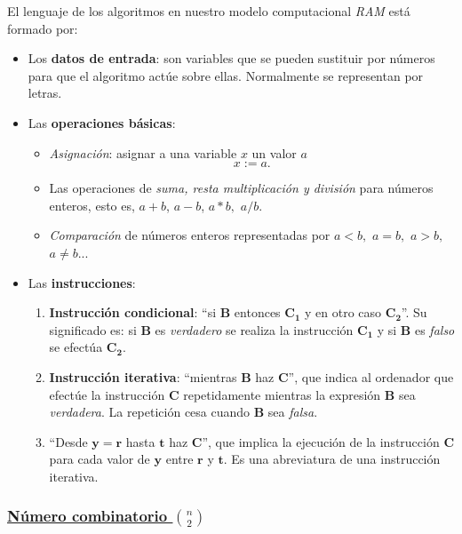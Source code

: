 \documentclass[ebook,oneside]{memoir}
\newcommand{\bolds}[1]{\boldsymbol{#1}}
\begin{document}
El lenguaje de los algoritmos en nuestro modelo computacional \emph{RAM} est\'{a} formado por:
 \begin{itemize}
   \item Los \textbf{datos de entrada}: son variables que se pueden sustituir por n\'{u}meros para que el algoritmo act\'{u}e sobre ellas. Normalmente se representan por letras.
   \item Las \textbf{operaciones b\'{a}sicas}:
    \begin{itemize}
      \item \emph{Asignaci\'{o}n}: asignar a una variable $x$ un valor $a$ $$x:=a.$$
      \item Las operaciones de \emph{suma, resta multiplicaci\'{o}n y divisi\'{o}n} para n\'{u}meros enteros, esto es, $a+b$, $a-b$,
            $a*b,$ $a/b.$
      \item \emph{Comparaci\'{o}n} de n\'{u}meros enteros representadas por $a<b,$ $a=b,$ $a>b,$ $a\neq b$...
    \end{itemize}
   \item Las \textbf{instrucciones}:
      \begin{enumerate}
        \item \textbf{Instrucci\'{o}n condicional}: ``\textsf{si} $\bolds{B}$ \textsf{entonces} $\bolds{C_1}$ \textsf{y en otro caso} $\bolds{C_2}$''. Su significado es: si $\bolds{B}$ es \emph{verdadero} se realiza la instrucci\'{o}n $\bolds{C_1}$ y si $\bolds{B}$ es \emph{falso} se efect\'{u}a $\bolds{C_2}$.
        \item \textbf{Instrucci\'{o}n iterativa}: ``\textsf{mientras} $\bolds{B}$ \textsf{haz}  $\bolds{C}$'', que indica al ordenador que efect\'{u}e la instrucci\'{o}n $\bolds{C}$ repetidamente mientras la expresi\'{o}n $\bolds{B}$ sea \emph{verdadera}. La repetici\'{o}n cesa cuando $\bolds{B}$ sea \emph{falsa}.
        \item ``\textsf{Desde} $\bolds{y=r}$ \textsf{hasta} $\bolds{t}$ \textsf{haz} $\bolds{C}$'', que implica la ejecuci\'{o}n de la ins\-truc\-ci\'{o}n $\bolds{C}$ para cada valor de $\bolds{y}$ entre $\bolds{r}$ y $\bolds{t}$. Es una abreviatura de una instrucci\'{o}n iterativa.
      \end{enumerate}
 \end{itemize}

\subsubsection{\underline{N\'{u}mero combinatorio   $\binom{n}{2}$}}
\end{document}
